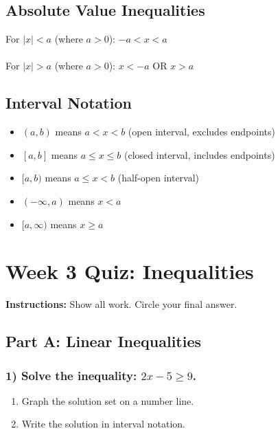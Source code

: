 \documentclass[12pt]{article}
\begin{document}
        \subsection*{Absolute Value Inequalities}
            For $|x| < a$ (where $a > 0$): $-a < x < a$\\\\
            For $|x| > a$ (where $a > 0$): $x < -a$ OR $x > a$

        \subsection*{Interval Notation}
            \begin{itemize}
                \item $(a, b)$ means $a < x < b$ (open interval, excludes endpoints)
                \item $[a, b]$ means $a \leq x \leq b$ (closed interval, includes endpoints)
                \item $[a, b)$ means $a \leq x < b$ (half-open interval)
                \item $(-\infty, a)$ means $x < a$
                \item $[a, \infty)$ means $x \geq a$
            \end{itemize}

            \newpage

    \section*{Week 3 Quiz: Inequalities}
	
        \textbf{Instructions:} Show all work. Circle your final answer.
        
        \subsection*{Part A: Linear Inequalities}
            
            \subsubsection*{1) Solve the inequality: $2x - 5 \geq 9$.}

                \begin{enumerate}
                    \item[(a)] Graph the solution set on a number line.
                    \item[(b)] Write the solution in interval notation.
                \end{enumerate}
                
\end{document}
